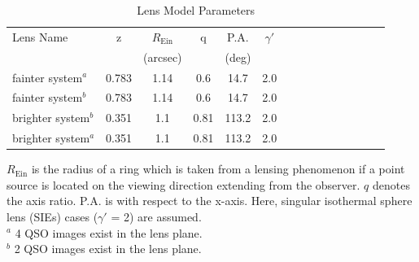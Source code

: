 \documentclass[a4paper,11pt]{article}
\begin{document}
\begin{table}\footnotesize
\begin{center}
\caption{Lens Model Parameters}
\begin{tabular}{lcccccccccccccc|}
\hline \hline
Lens Name & z & $R_\textrm{Ein}$ & q & P.A. & $\gamma'$\\
& & (arcsec) & & (deg) \\
\hline
fainter system$^a$ & 0.783 & 1.14   &   0.6  &   14.7  &  2.0 \\
fainter system$^b$ &  0.783 & 1.14   &   0.6  &   14.7  &  2.0 \\
brighter system$^b$ & 0.351 &  1.1    &   0.81  &   113.2  &  2.0 \\
brighter system$^a$ &  0.351 & 1.1    &   0.81  &   113.2   &  2.0 \\
\hline
\hline
\end{tabular}
\begin{tablenotes}
\item 
$R_\textrm{Ein}$ is the radius of a ring which is taken from a lensing phenomenon if a point source is located on the viewing direction extending from the observer. $q$ denotes the axis ratio. P.A. is with respect to the x-axis. Here, singular isothermal sphere lens (SIEs) cases ($\gamma'$ = 2) are assumed.\\
$^a$ 4 QSO images exist in the lens plane. \\
$^b$ 2 QSO images exist in the lens plane. \\
\end{tablenotes}
\end{center}
\end{table}
\end{document}
